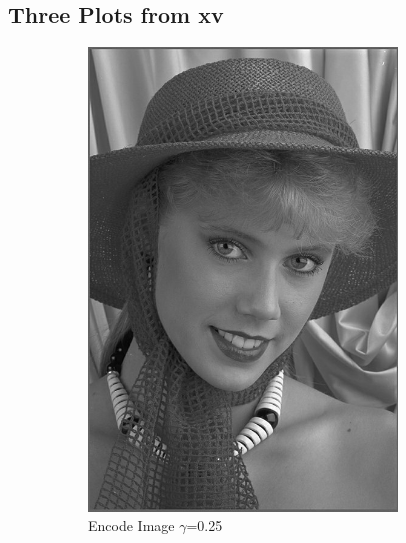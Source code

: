 \documentclass{article}
\begin{document}
	\subsection{Three Plots from xv}
			\begin{figure}[!htb]
				\begin{subfigure}{0.33\textwidth}
					\includegraphics[width=0.9\textwidth]{img03y_1.jpeg}
					\caption{Encode Image $\gamma$=0.25}
				\end{subfigure}
				\begin{subfigure}{0.33\textwidth}

\end{subfigure}
\end{figure}
\end{document}
